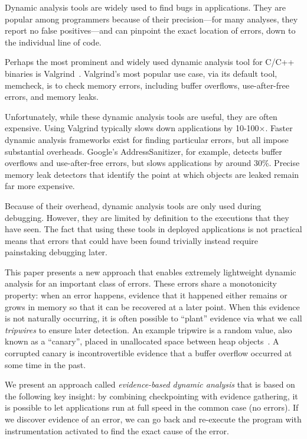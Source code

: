 
Dynamic analysis tools are widely used to find bugs in
applications. They are popular among programmers because of their
precision---for many analyses, they report no false positives---and
can pinpoint the exact location of errors, down to the individual line
of code.

Perhaps the most prominent and widely used dynamic analysis tool for
C/C++ binaries is Valgrind~\cite{overflow:valgrind}. Valgrind's most
popular use case, via its default tool, memcheck, is to check memory
errors, including buffer overflows, use-after-free errors, and
memory leaks.

Unfortunately, while these dynamic analysis tools are useful, they are
often expensive. Using Valgrind typically slows down applications by
10-100$\times$. Faster dynamic analysis frameworks exist for finding
particular errors, but all impose substantial overheads. Google's
AddressSanitizer, for example, detects buffer overflows and
use-after-free errors, but slows applications by around 30\%. Precise
memory leak detectors that identify the point at which objects are
leaked remain far more expensive.

Because of their overhead, dynamic analysis tools are only used during
debugging. However, they are limited by definition to the executions
that they have seen. The fact that using these tools in deployed
applications is not practical means that errors that could
have been found trivially instead require painstaking debugging
later.

This paper presents a new approach that enables extremely lightweight
dynamic analysis for an important class of errors. These errors share
a monotonicity property: when an error happens, evidence that it
happened either remains or grows in memory so that it can be recovered at a
later point. When this evidence is not naturally occurring, it is
often possible to ``plant'' evidence via what we call \emph{tripwires}
to ensure later detection. An example tripwire is a random value, also
known as a ``canary'', placed in unallocated space between heap
objects~\cite{StackGuard}. A corrupted canary is incontrovertible 
evidence that a buffer overflow occurred at some time in the past.

We present an approach called \emph{evidence-based dynamic analysis} that is based on the
following key insight: by combining checkpointing with evidence
gathering, it is possible to let applications run at full speed in the
common case (no errors). If we discover evidence of an error, we can
go back and re-execute the program with instrumentation activated to
find the exact cause of the error.


